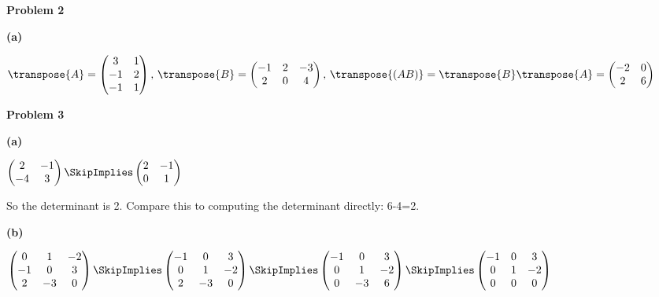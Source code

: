\documentclass[oneside,12pt]{amsart}
\begin{document}

\bigskip

\textbf{Problem 2}

\bigskip

\textbf{(a)}

$
\transpose{A}=
\begin{pmatrix}
3 & 1 \\
-1 & 2 \\
-1 & 1
\end{pmatrix}
\text{, }
\transpose{B}=
\begin{pmatrix}
-1 & 2 & -3 \\
2 & 0 & 4
\end{pmatrix}
\text{, }
\transpose{(AB)} = \transpose{B}\transpose{A}=
\begin{pmatrix}
-2 & 0 \\
2 & 6
\end{pmatrix}
$


\bigskip

\textbf{Problem 3}

\textbf{(a)}

\bigskip

$
\begin{pmatrix}
2 & -1 \\
-4 & 3
\end{pmatrix}
\SkipImplies
\begin{pmatrix}
2 & -1 \\
0 & 1
\end{pmatrix}
$

\bigskip

So the determinant is 2. Compare this to computing the determinant directly: 6-4=2.

\bigskip

\textbf{(b)}

\bigskip

$
\begin{pmatrix}
0 & 1 & -2 \\
-1 & 0 & 3 \\
2 & -3 & 0
\end{pmatrix}
\SkipImplies
\begin{pmatrix}
-1 & 0 & 3 \\
0 & 1 & -2 \\
2 & -3 & 0
\end{pmatrix}
\SkipImplies
\begin{pmatrix}
-1 & 0 & 3 \\
0 & 1 & -2 \\
0 & -3 & 6
\end{pmatrix}
\SkipImplies
\begin{pmatrix}
-1 & 0 & 3 \\
0 & 1 & -2 \\
0 & 0 & 0
\end{pmatrix}
$
\end{document}
